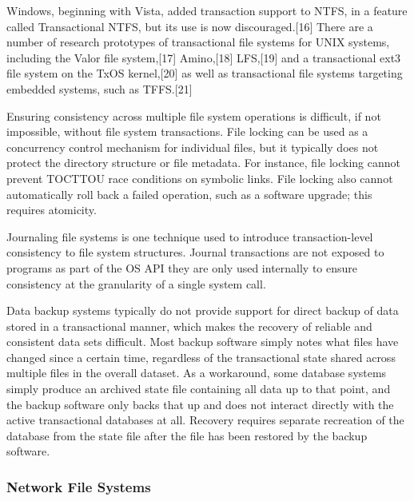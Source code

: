 Windows, beginning with Vista, added transaction support to NTFS, in a feature
called Transactional NTFS, but its use is now discouraged.[16] There are a
number of research prototypes of transactional file systems for UNIX systems,
including the Valor file system,[17] Amino,[18] LFS,[19] and a transactional
ext3 file system on the TxOS kernel,[20] as well as transactional file systems
targeting embedded systems, such as TFFS.[21]



Ensuring consistency across multiple file system operations is difficult, if not
impossible, without file system transactions. File locking can be used as a
concurrency control mechanism for individual files, but it typically does not
protect the directory structure or file metadata. For instance, file locking
cannot prevent TOCTTOU race conditions on symbolic links. File locking also
cannot automatically roll back a failed operation, such as a software upgrade;
this requires atomicity.



Journaling file systems is one technique used to introduce transaction-level
consistency to file system structures. Journal transactions are not exposed to
programs as part of the OS API they are only used internally to ensure
consistency at the granularity of a single system call.



Data backup systems typically do not provide support for direct backup of data
stored in a transactional manner, which makes the recovery of reliable and
consistent data sets difficult. Most backup software simply notes what files
have changed since a certain time, regardless of the transactional state shared
across multiple files in the overall dataset. As a workaround, some database
systems simply produce an archived state file containing all data up to that
point, and the backup software only backs that up and does not interact directly
with the active transactional databases at all. Recovery requires separate
recreation of the database from the state file after the file has been restored
by the backup software.

\subsubsectionend

\subsubsection{Network File Systems}
\label{sssec:network_file_systems}


